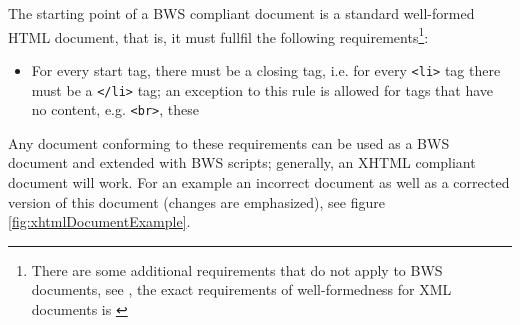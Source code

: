 The starting point of a BWS compliant document is a standard well-formed HTML document, that is, it must fullfil the following requirements\footnote{There are some additional requirements that do not apply to BWS documents, see \cite{references}, the exact requirements of well-formedness for XML documents is \cite{w3reference}}:

\begin{itemize}


\item For every start tag, there must be a closing tag, i.e. for every \texttt{<li>} tag there must be a
\texttt{</li>} tag; an exception to this rule is allowed for tags that have no content, e.g. \texttt{<br>}, these






\end{itemize}

Any document conforming to these requirements can be used as a BWS document and extended with BWS scripts; generally, an XHTML compliant document will work. For an example an incorrect document as well as a corrected version of this document (changes are emphasized), see figure \ref{fig:xhtmlDocumentExample}. 


